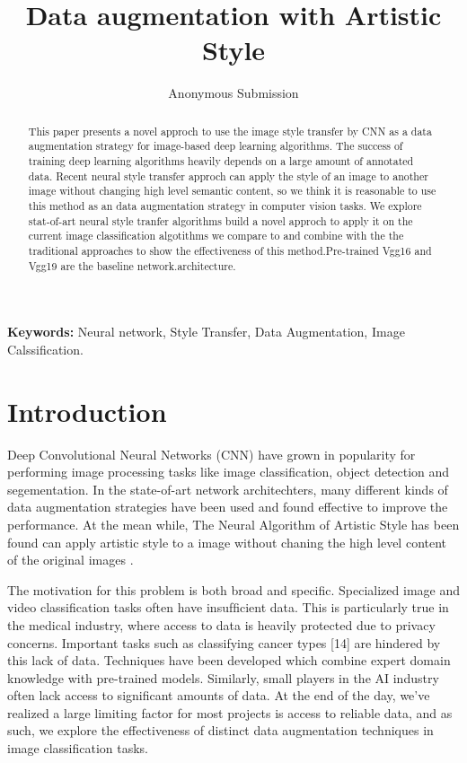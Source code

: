 \documentclass[a4paper,11pt]{article}
\begin{document}
\title{Data augmentation with Artistic Style }

\author{Anonymous Submission}
\date{}
\maketitle
\thispagestyle{empty}



\begin{abstract}
This paper presents a novel approch to use the image style transfer by CNN as a data augmentation strategy for image-based deep learning algorithms. The success of training deep learning algorithms heavily depends on a large amount of annotated data. Recent neural style transfer approch can apply the style of an image to another image without changing high level semantic content, so we think it is reasonable to use this method as an data augmentation strategy in computer vision tasks. We explore stat-of-art neural style tranfer algorithms build a novel approch to apply it on the current image classification algotithms we compare to and combine with the the traditional approaches to show the effectiveness of this method.Pre-trained Vgg16 and Vgg19 are the baseline network.architecture.
\end{abstract}
\textbf{Keywords:} Neural network, Style Transfer, Data Augmentation, Image Calssification.

\section{Introduction}
Deep Convolutional Neural Networks (CNN) have grown in popularity for performing image processing tasks like image classification, object detection and segementation. In the state-of-art network architechters, many different kinds of data augmentation strategies have been used and found effective to improve the performance.
At the mean while, The Neural Algorithm of Artistic Style has been found can apply artistic style to a image without chaning the high level content of the original images \cite{Image Style Transfer Using Convolutional Neural Networks}.

The motivation for this problem is both broad and speciﬁc. Specialized image and video classiﬁcation tasks often have insufﬁcient data. This is particularly true in the medical industry, where access to data is heavily protected due to privacy concerns. Important tasks such as classifying cancer types [14] are hindered by this lack of data. Techniques have been developed which combine expert domain knowledge with pre-trained models. Similarly, small players in the AI industry often lack access to signiﬁcant amounts of data. At the end of the day, we’ve realized a large limiting factor for most projects is access to reliable data, and as such, we explore the effectiveness of distinct data augmentation techniques in image classiﬁcation tasks.
\end{document}
